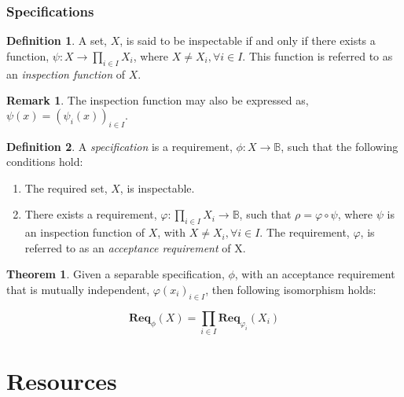 \documentclass{article}
\theoremstyle{definition}
\newtheorem{definition}{Definition}[section]
\newtheorem*{remark}{Remark}
\newtheorem*{theorem}{Theorem}
\theoremstyle{remark}
\newcommand{\func}[3]{#1:#2\rightarrow#3}
\newcommand{\reqfunc}[2]{#1:#2\rightarrow\mathbb{B}}
\newcommand{\reqop}[2]{\mathbf{Req}_{#1}(#2)}
\begin{document}
	\section{Specifications}
	
		\begin{definition}
			A set, $X$, is said to be inspectable if and only if there exists a function,
            $\func{\psi}{X}{\prod_{i \in I}{X_{i}}}$, where $X \ne X_{i}, \forall i \in I$. This function is referred to as an
            \emph{inspection function} of $X$.
		\end{definition}
		
		\begin{remark}
			The inspection function may also be expressed as, $\psi(x) = (\psi_{i}(x))_{i \in I}.$
		\end{remark}
		
		\begin{definition}
			A \emph{specification} is a requirement, $\reqfunc{\phi}{X}$, such that the following conditions
			hold:
			
			\begin{enumerate}
				\item   The required set, $X$, is inspectable.
				
				\item   There exists a requirement, $\reqfunc{\varphi}{\prod_{i \in I}{X_{i}}}$,
				such that $\rho = \varphi \circ \psi$, where $\psi$ is an inspection function of $X$,
				with $X \ne X_{i}, \forall i \in I$. The requirement, $\varphi$, is referred to as an
				\emph{acceptance requirement} of X.
			\end{enumerate}
			
		\end{definition}
		
		\begin{theorem}
			Given a separable specification, $\phi$, with an acceptance requirement that is mutually independent,
			$\varphi(x_i)_{i \in I}$, then following isomorphism holds:
			
			\[
			\reqop{\phi}{X} = \prod_{i \in I}\reqop{\varphi_{i}}{X_{i}}
			\]
		\end{theorem}
	
	\newpage
	
	\part{Resources}
	
	\newpage
	
\end{document}
